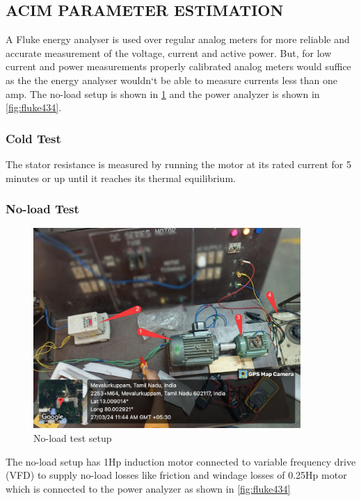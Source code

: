 \subsection{ACIM PARAMETER ESTIMATION}


A Fluke energy analyser is used over regular analog meters for more reliable and accurate measurement of the voltage, current and active power. But, for low current and power measurements properly calibrated analog meters would suffice as the the energy analyser wouldn`t be able to measure currents less than one amp. The no-load setup is shown in \ref{fig:no_load_test_setup} and the power analyzer is shown in \ref{fig:fluke434}.

\subsubsection{Cold Test}

The stator resistance is measured by running the motor at its rated current for 5 minutes or up until it reaches its thermal equilibrium.


\subsubsection{No-load Test}


\begin{figure}
	\centering
	\includegraphics[width=4in]{sections/section5/images/ParamEstim/SetupNoload.jpg}
	\caption{No-load test setup}
	\label{fig:no_load_test_setup}
\end{figure}

The no-load setup has 1Hp induction motor connected to variable frequency drive (VFD) to supply no-load losses like friction and windage losses of 0.25Hp motor which is connected to the power analyzer as shown in \ref*{fig:fluke434}


